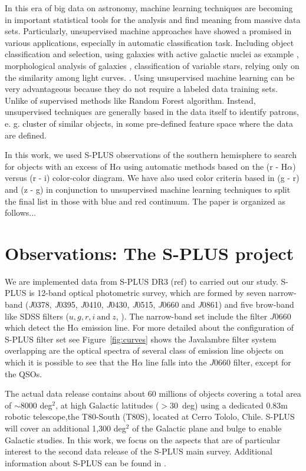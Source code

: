 \documentclass[fleqn,usenatbib]{mnras}
\begin{document}
In this era of big data on astronomy, machine learning techniques are becoming
in important statistical tools for the analysis and find meaning from massive
data sets. Particularly, unsupervised machine approaches have showed a promised
in various applications, especially in automatic classification task. Including
object classification and selection, using galaxies with active galactic nuclei
as example \citep{Geach:2012}, morphological analysis of galaxies \citep{Martin:2020},
classification of variable stars, relying only on the similarity among light
curves. \citep{Valenzuela:2018}. Using unsupervised machine
learning can be very advantageous because they do not require a labeled data
training sets. Unlike of supervised methods like Random Forest algorithm.
Instead, unsupervised techniques are generally based in the data itself to
identify patrons, e. g. cluster of similar objects, in some pre-defined
feature space where the data are defined.

In this work, we used S-PLUS observations of the southern hemisphere to search
for objects with an excess of H{$\alpha$} using automatic methods based on the
(r - H$\alpha$) versus (r - i) color-color diagram. We have also used color criteria
based in (g - r) and (z - g) in conjunction to unsupervised machine learning
techniques to split the final list in those with blue and red continuum. The
paper is organized as follows...

\section{Observations: The S-PLUS project}
\label{sec:obser}

We are implemented data from S-PLUS DR3 (ref) to carried out our
study. S-PLUS is 12-band optical photometric survey, which are formed by
seven narrow-band (\textit{J}0378, \textit{J}0395, \textit{J}0410, \textit{J}0430,
\textit{J}0515, \textit{J}0660 and \textit{J}0861) and five brow-band like
SDSS filters (\(u, g, r, i~\mathrm{and}~z\), \citealp{Fukugita:1996}).
The narrow-band set include the filter $J$0660 which detect
the H{$\alpha$} emission line. For more detailed about the configuration of
S-PLUS filter set see Figure~\ref{fig:curves} shows the Javalambre filter
system \citep{Martin-Franch:2012} overlapping are the optical spectra of
several class of emission line objects on which it is possible to see that the
H{$\alpha$} line falls into the $J$0660 filter, except for the QSOs.   

The actual data release contains about 60 millions of objects covering a total
area of $\sim$8000 deg$^2$, at high Galactic latitudes ($ > 30$~deg) using a
dedicated 0.83m robotic telescope,the T80-South (T80S), located at Cerro Tololo,
Chile. S-PLUS will cover an additional 1,300 deg$^2$ of the Galactic plane and bulge
to enable Galactic studies. In this work, we focus on the aspects that are of
particular interest to the second data release of the S-PLUS main survey.
Additional information about S-PLUS can be found in \citet{Mendes:2019}. 
\end{document}
